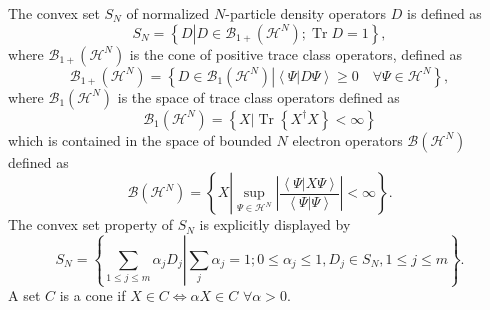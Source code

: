 \documentclass[aps,preprint]{revtex4}%
\begin{document}
The convex set $S_{N}$ of normalized $N$-particle density operators $D$ is
defined as
\begin{equation}
S_{N}=\left\{  D\left\vert D\in\mathcal{B}_{1+}\left(  \mathcal{H}^{N}\right)
;\operatorname{Tr}D=1\right.  \right\}  ,
\end{equation}
where $\mathcal{B}_{1+}\left(  \mathcal{H}^{N}\right)  $ is the cone of
positive trace class operators, defined as
\begin{equation}
\mathcal{B}_{1+}\left(  \mathcal{H}^{N}\right)  =\left\{  D\in\mathcal{B}%
_{1}\left(  \mathcal{H}^{N}\right)  \left\vert \overset{}{\left\langle
\Psi\left\vert D\Psi\right.  \right\rangle }\geq0\quad\forall\Psi
\in\mathcal{H}^{N}\right.  \right\}  ,
\end{equation}
where $\mathcal{B}_{1}\left(  \mathcal{H}^{N}\right)  $ is the space of trace
class operators defined as
\begin{equation}
\mathcal{B}_{1}\left(  \mathcal{H}^{N}\right)  =\left\{  \left.  X\right\vert
\operatorname{Tr}\left\{  X^{\dagger}X\right\}  <\infty\right\}
\end{equation}
which is contained in the space of bounded $N$ electron operators
$\mathcal{B}\left(  \mathcal{H}^{N}\right)  $ defined as
\begin{equation}
\mathcal{B}\left(  \mathcal{H}^{N}\right)  =\left\{  X\left\vert \sup_{\Psi
\in\mathcal{H}^{N}}\left\vert \frac{\left\langle \Psi\left\vert X\Psi\right.
\right\rangle }{\left\langle \Psi\left\vert \Psi\right.  \right\rangle
}\right\vert <\infty\right.  \right\}  .
\end{equation}
The convex set property of $S_{N}$ is explicitly displayed by
\begin{equation}
S_{N}=\left\{  \left.  \sum_{1\leq j\leq m}\alpha_{j}D_{j}\right\vert \sum
_{j}\alpha_{j}=1;0\leq\alpha_{j}\leq1,D_{j}\in S_{N},1\leq j\leq m\right\}  .
\end{equation}
A set $C$ is a cone if $X\in C\Leftrightarrow\alpha X\in C$ $\forall\alpha>0.$
\end{document}
